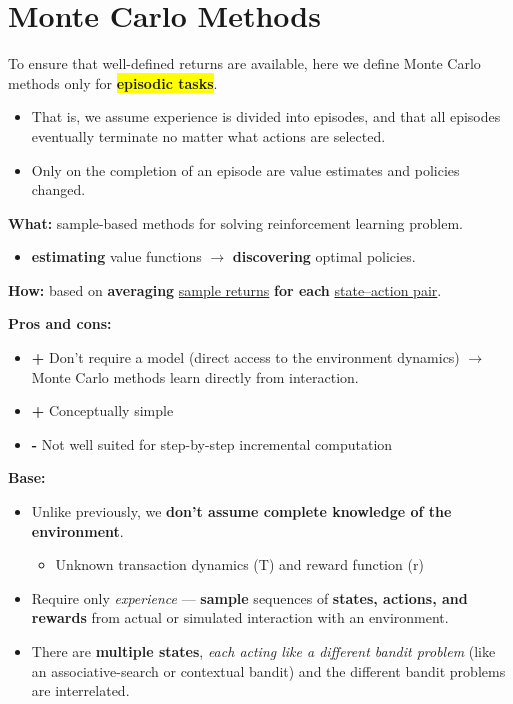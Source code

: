 \documentclass[12pt, a4paper]{article}
\let\stdsection\section
\renewcommand\section{\newpage\stdsection} %
\begin{document}



\section{Monte Carlo Methods}\label{monte-carlo-methods}

\begin{tcolorbox}[colback=yellow!5,colframe=yellow!75!black,title=NOTE]
  To ensure that well-defined returns are available, here we define Monte
  Carlo methods only for \textbf{\colorbox{Yellow}{episodic tasks}}.
  \begin{itemize}
    \item That is, we assume experience is divided into episodes, and that all episodes eventually terminate no matter what actions are selected.
    \item Only on the completion of an episode are value estimates and policies changed.
  \end{itemize}
\end{tcolorbox}

\textbf{What:} sample-based methods for solving reinforcement learning problem.
\begin{itemize}
  \item \textbf{estimating} value functions \(\rightarrow\) \textbf{discovering}
  optimal policies.
\end{itemize}

\textbf{How:} based on \textbf{averaging} \uline{sample returns} \textbf{for
each} \uline{state--action pair}.

\textbf{Pros and cons:}
\begin{itemize}
  \item \textbf{+} Don't require a model (direct access to the environment dynamics) $\rightarrow$ Monte Carlo methods learn directly from interaction.
  \item \textbf{+} Conceptually simple
  \item \textbf{-} Not well suited for step-by-step incremental computation
\end{itemize}

\textbf{Base:}

\begin{itemize}
\item
  Unlike previously, we \textbf{don't assume complete knowledge of the
  environment}.

  \begin{itemize}
  \item
    Unknown transaction dynamics (T) and reward function (r)
  \end{itemize}
\item
  Require only \emph{experience} --- \textbf{sample} sequences of
  \textbf{states, actions, and rewards} from actual or simulated
  interaction with an environment.
\item
  There are \textbf{multiple states}, \emph{each acting like a different
  bandit problem} (like an associative-search or contextual bandit) and
  the different bandit problems are interrelated.
\end{itemize}
\end{document}
